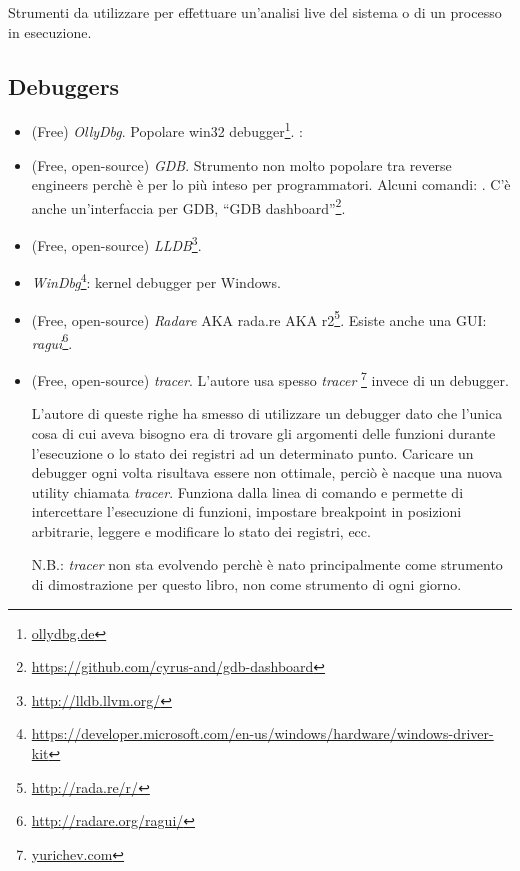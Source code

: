 
Strumenti da utilizzare per effettuare un'analisi live del sistema o di un processo in esecuzione.

\subsection{Debuggers}

\myindex{\olly}

\begin{itemize}
\item (Free) \emph{OllyDbg}.
Popolare win32 debugger\footnote{\href{http://go.yurichev.com/17032}{ollydbg.de}}.
\ShortHotKeyCheatsheet: 

\item (Free, open-source) \emph{GDB}.
Strumento non molto popolare tra reverse engineers perchè è per lo più inteso per programmatori.
Alcuni comandi: .
C'è anche un'interfaccia per GDB, ``GDB dashboard''\footnote{\url{https://github.com/cyrus-and/gdb-dashboard}}.

\item (Free, open-source) \emph{LLDB}\footnote{\url{http://lldb.llvm.org/}}.

\item \emph{WinDbg}\footnote{\url{https://developer.microsoft.com/en-us/windows/hardware/windows-driver-kit}}:
kernel debugger per Windows.

\item (Free, open-source) \emph{Radare} \ac{AKA} rada.re \ac{AKA} r2\footnote{\url{http://rada.re/r/}}.
Esiste anche una GUI: \emph{ragui}\footnote{\url{http://radare.org/ragui/}}.

\item (Free, open-source) \emph{tracer}.
\label{tracer}
L'autore usa spesso \emph{tracer}
\footnote{\href{http://go.yurichev.com/17338}{yurichev.com}}
invece di un debugger.

L'autore di queste righe ha smesso di utilizzare un debugger dato che l'unica cosa di cui aveva bisogno era di trovare gli
argomenti delle funzioni durante l'esecuzione o lo stato dei registri ad un determinato punto.
Caricare un debugger ogni volta risultava essere non ottimale, perciò è nacque una nuova utility chiamata \emph{tracer}.
Funziona dalla linea di comando e permette di intercettare l'esecuzione di funzioni,
impostare breakpoint in posizioni arbitrarie, leggere e modificare lo stato dei registri, ecc.

N.B.: \emph{tracer} non sta evolvendo perchè è nato principalmente come strumento di dimostrazione per questo libro, non come strumento di ogni giorno.
\end{itemize}

